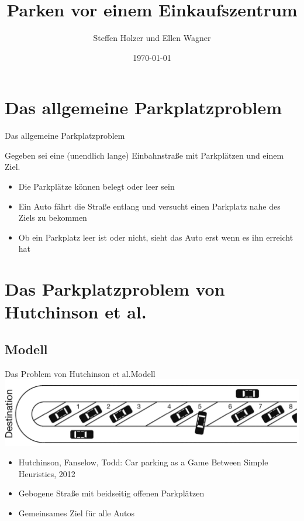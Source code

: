 \documentclass[11pt]{beamer}
\author{Steffen Holzer und Ellen Wagner}
\title{Parken vor einem Einkaufszentrum}
\date{\today}
\begin{document}
\begin{frame}
\titlepage
\end{frame}

\begin{frame}
\tableofcontents
\end{frame}


\section{Das allgemeine Parkplatzproblem}
\begin{frame}{Das allgemeine Parkplatzproblem}

Gegeben sei eine (unendlich lange) Einbahnstraße mit Parkplätzen und einem Ziel.
\begin{itemize}
	\item Die Parkplätze können belegt oder leer sein
	\item Ein Auto fährt die Straße entlang und versucht einen Parkplatz nahe des Ziels zu bekommen
	\item Ob ein Parkplatz leer ist oder nicht, sieht das Auto erst wenn es ihn erreicht hat
\end{itemize}
\end{frame}


\section{Das Parkplatzproblem von Hutchinson et al.}
\subsection{Modell}

\begin{frame}{Das Problem von Hutchinson et al.}{Modell}
\includegraphics[width=\textwidth]{carparking.png}
\begin{itemize}
	\item Hutchinson, Fanselow, Todd: Car parking as a Game Between Simple Heuristics, 2012
	\item Gebogene Straße mit beidseitig offenen Parkplätzen
	\item Gemeinsames Ziel für alle Autos
\end{itemize}

\end{frame}
\end{document}
